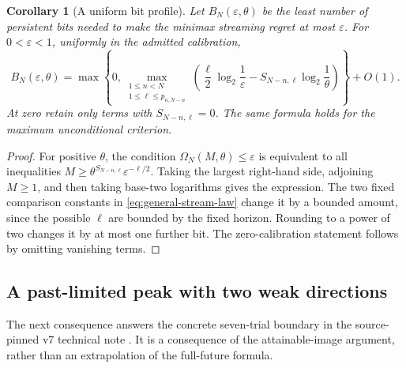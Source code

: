 \documentclass[11pt]{amsart}
\newtheorem{corollary}[theorem]{Corollary}
\theoremstyle{definition}\newtheorem{definition}[theorem]{Definition}
\theoremstyle{remark}\newtheorem{remark}[theorem]{Remark}
\begin{document}
\begin{corollary}[A uniform bit profile]\label{cor:general-bit-profile}
Let $B_N(\varepsilon,\theta)$ be the least number of persistent bits
needed to make the minimax streaming regret at most $\varepsilon$.
For $0<\varepsilon<1$, uniformly in the admitted calibration,
\begin{equation}\label{eq:general-bit-profile}
 B_N(\varepsilon,\theta)=
 \max\left\{0,\max_{\substack{1\le n<N\\1\le\ell\le p_{n,N-n}}}
 \left(\frac\ell2\log_2\frac1\varepsilon
       -S_{N-n,\ell}\log_2\frac1\theta\right)\right\}+O(1).
\end{equation}
At zero retain only terms with $S_{N-n,\ell}=0$. The same formula
holds for the maximum unconditional criterion.
\end{corollary}
\begin{proof}
For positive $\theta$, the condition
$\Omega_N(M,\theta)\le\varepsilon$ is equivalent to all inequalities
$M\ge\theta^{S_{N-n,\ell}}\varepsilon^{-\ell/2}$.
Taking the largest right-hand side, adjoining $M\ge1$, and then taking
base-two logarithms gives the expression. The two fixed comparison
constants in \eqref{eq:general-stream-law} change it by a bounded
amount, since the possible $\ell$ are bounded by the fixed horizon.
Rounding to a power of two changes it by at most one further bit.
The zero-calibration statement follows by omitting vanishing terms.
\end{proof}

\subsection{A past-limited peak with two weak directions}
The next consequence answers the concrete seven-trial boundary in the
source-pinned v7 technical note \cite{A1v7note}. It is a consequence
of the attainable-image argument, rather than an extrapolation of the
full-future formula.
\end{document}
